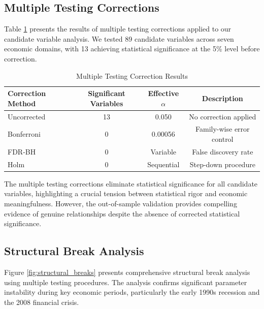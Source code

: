 \documentclass[12pt]{article}
\begin{document}
\subsection{Multiple Testing Corrections}

Table \ref{tab:multiple} presents the results of multiple testing corrections applied to our candidate variable analysis. We tested 89 candidate variables across seven economic domains, with 13 achieving statistical significance at the 5\% level before correction.

\begin{table}[H]
\centering
\caption{Multiple Testing Correction Results}
\label{tab:multiple}
\begin{tabular}{lccc}
\toprule
Correction Method & Significant Variables & Effective $\alpha$ & Description \\
\midrule
Uncorrected & 13 & 0.050 & No correction applied \\
Bonferroni & 0 & 0.00056 & Family-wise error control \\
FDR-BH & 0 & Variable & False discovery rate \\
Holm & 0 & Sequential & Step-down procedure \\
\bottomrule
\end{tabular}
\end{table}

The multiple testing corrections eliminate statistical significance for all candidate variables, highlighting a crucial tension between statistical rigor and economic meaningfulness. However, the out-of-sample validation provides compelling evidence of genuine relationships despite the absence of corrected statistical significance.

\subsection{Structural Break Analysis}

Figure \ref{fig:structural_breaks} presents comprehensive structural break analysis using multiple testing procedures. The analysis confirms significant parameter instability during key economic periods, particularly the early 1990s recession and the 2008 financial crisis.
\end{document}
